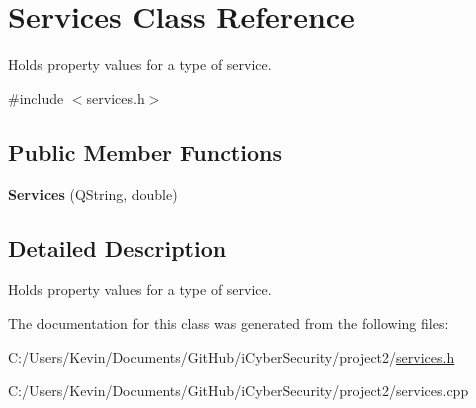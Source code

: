 \hypertarget{class_services}{}\section{Services Class Reference}
\label{class_services}


Holds property values for a type of service.  




{\ttfamily \#include $<$services.\+h$>$}

\subsection*{Public Member Functions}
\begin{DoxyCompactItemize}
\item 
\mbox{\label{class_services_af3f011adec7bb879dbe2edd7d82c3189}} 
{\bfseries Services} (Q\+String, double)
\end{DoxyCompactItemize}


\subsection{Detailed Description}
Holds property values for a type of service. 

The documentation for this class was generated from the following files\+:\begin{DoxyCompactItemize}
\item 
C\+:/\+Users/\+Kevin/\+Documents/\+Git\+Hub/i\+Cyber\+Security/project2/\mbox{\hyperlink{services_8h}{services.\+h}}\item 
C\+:/\+Users/\+Kevin/\+Documents/\+Git\+Hub/i\+Cyber\+Security/project2/services.\+cpp\end{DoxyCompactItemize}
